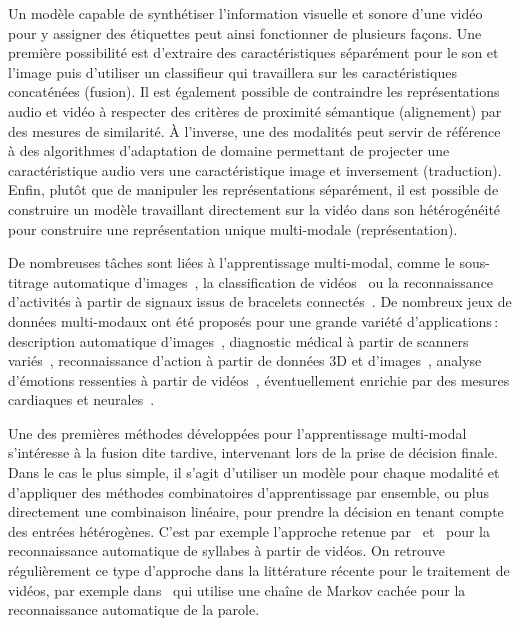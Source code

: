 Un modèle capable de synthétiser l'information visuelle et sonore d'une vidéo pour y assigner des étiquettes peut ainsi fonctionner de plusieurs façons. Une première possibilité est d'extraire des caractéristiques séparément pour le son et l'image puis d'utiliser un classifieur qui travaillera sur les caractéristiques concaténées (fusion). Il est également possible de contraindre les représentations audio et vidéo à respecter des critères de proximité sémantique (alignement) par des mesures de similarité. À l'inverse, une des modalités peut servir de référence à des algorithmes d'adaptation de domaine permettant de projecter une caractéristique audio vers une caractéristique image et inversement (traduction). Enfin, plutôt que de manipuler les représentations séparément, il est possible de construire un modèle travaillant directement sur la vidéo dans son hétérogénéité pour construire une représentation unique multi-modale (représentation).

De nombreuses tâches sont liées à l'apprentissage multi-modal, comme le sous-titrage automatique d'images~\cite{karpathy_deep_2015}, la classification de vidéos~\cite{kim_deep_2013} ou la reconnaissance d'activités à partir de signaux issus de bracelets connectés~\cite{ordonez_deep_2016}. De nombreux jeux de données multi-modaux ont été proposés pour une grande variété d'applications\,: description automatique d'images~\cite{hodosh_framing_2013}, diagnostic médical à partir de scanners variés~\cite{menze_multimodal_2015}, reconnaissance d'action à partir de données 3D et d'images~\cite{ofli_berkeley_2013}, analyse d'émotions ressenties à partir de vidéos~\cite{schuller_avec_2011}, éventuellement enrichie par des mesures cardiaques et neurales~\cite{ringeval_introducing_2013}.

Une des premières méthodes développées pour l'apprentissage multi-modal s'intéresse à la fusion dite tardive, intervenant lors de la prise de décision finale. Dans le cas le plus simple, il s'agit d'utiliser un modèle pour chaque modalité et d'appliquer des méthodes combinatoires d'apprentissage par ensemble, ou plus directement une combinaison linéaire, pour prendre la décision en tenant compte des entrées hétérogènes. C'est par exemple l'approche retenue par~\citet{yuhas_integration_1989} et~\citet{meier_adaptive_1996} pour la reconnaissance automatique de syllabes à partir de vidéos. On retrouve régulièrement ce type d'approche dans la littérature récente pour le traitement de vidéos, par exemple dans~\cite{noda_audio-visual_2015} qui utilise une chaîne de Markov cachée pour la reconnaissance automatique de la parole.

